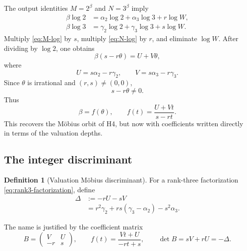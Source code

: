 \documentclass[11pt,oneside]{article}
\theoremstyle{research}
\theoremstyle{definition}
\newtheorem{definition}[theorem]{Definition}
\newcommand{\defeq}{\mathrel{:=}}
\begin{document}
The output identities $M=2^\beta$ and $N=3^\beta$ imply
\begin{align}
 \beta\log2
 &=\alpha_2\log2+\alpha_3\log3+r\log W,
 \label{eq:M-log}\\
 \beta\log3
 &=\gamma_2\log2+\gamma_3\log3+s\log W.
 \label{eq:N-log}
\end{align}
Multiply \eqref{eq:M-log} by $s$, multiply \eqref{eq:N-log} by $r$, and
eliminate $\log W$.  After dividing by $\log2$, one obtains
\begin{equation}
 \beta(s-r\theta)=U+V\theta,
 \label{eq:mobius-linear}
\end{equation}
where
\begin{equation}
 U=s\alpha_2-r\gamma_2,
 \qquad
 V=s\alpha_3-r\gamma_3.
 \label{eq:UV}
\end{equation}
Since $\theta$ is irrational and $(r,s)\ne(0,0)$,
\begin{equation}
 s-r\theta\ne0.
 \label{eq:denominator-nonzero}
\end{equation}
Thus
\begin{equation}
 \boxed{
 \beta=f(\theta),
 \qquad
 f(t)=\frac{U+Vt}{s-rt}.}
 \label{eq:mobius-beta}
\end{equation}
This recovers the M\"obius orbit of H4, but now with coefficients written
directly in terms of the valuation depths.

\subsection{The integer discriminant}

\begin{definition}[Valuation M\"obius discriminant]
\label{def:Delta}
For a rank-three factorization \eqref{eq:rank3-factorization}, define
\begin{align}
 \Delta
 &\defeq-rU-sV
 \label{eq:Delta-UV}\\
 &=r^2\gamma_2+rs(\gamma_3-\alpha_2)-s^2\alpha_3.
 \label{eq:Delta-depths}
\end{align}
\end{definition}

The name is justified by the coefficient matrix
\begin{equation}
 B=\begin{pmatrix}
      V & U\\
      -r&s
    \end{pmatrix},
 \qquad
 f(t)=\frac{Vt+U}{-rt+s},
 \qquad
 \det B=sV+rU=-\Delta.
 \label{eq:mobius-matrix}
\end{equation}
\end{document}
